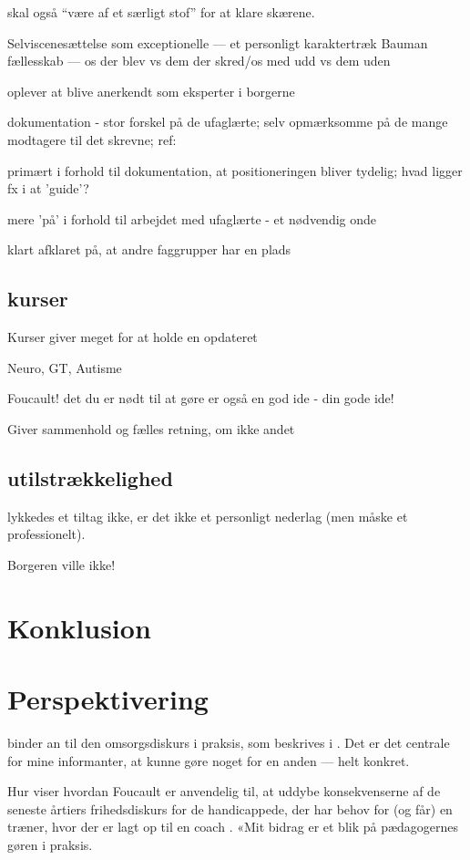 skal også “være af et særligt stof” for at klare skærene.

Selviscenesættelse som exceptionelle --- et personligt karaktertræk
Bauman fællesskab — os der blev vs dem der skred/os med udd vs dem uden

oplever at blive anerkendt som eksperter i borgerne

dokumentation - stor forskel på de ufaglærte; selv opmærksomme på de mange modtagere til det skrevne; ref: \autocite{hjerrildNarViSkriver2017, andersenUndervisningInstitutionOg2019}

primært i forhold til dokumentation, at positioneringen bliver tydelig; hvad ligger fx i at 'guide'?

mere 'på' i forhold til arbejdet med ufaglærte - et nødvendig onde

klart afklaret på, at andre faggrupper har en plads

\subsection{kurser}
Kurser giver meget for at holde en opdateret

Neuro, GT, Autisme

Foucault! det du er nødt til at gøre er også en god ide - din gode ide!

Giver sammenhold og fælles retning, om ikke andet

\subsection{utilstrækkelighed}
lykkedes et tiltag ikke, er det ikke et personligt nederlag (men måske et professionelt).

Borgeren ville ikke!

\section{Konklusion}

\section{Perspektivering}
binder an til den omsorgsdiskurs i praksis, som beskrives i .
Det er det centrale for mine informanter, at kunne gøre noget for en anden — helt konkret.

Hur viser hvordan Foucault er anvendelig til, at uddybe konsekvenserne af de seneste årtiers frihedsdiskurs for de handicappede, der har behov for (og får) en træner, hvor der er lagt op til en coach \autocite{hurFrigorelsensMagt2015}.
«Mit bidrag er et blik på pædagogernes gøren i praksis.
